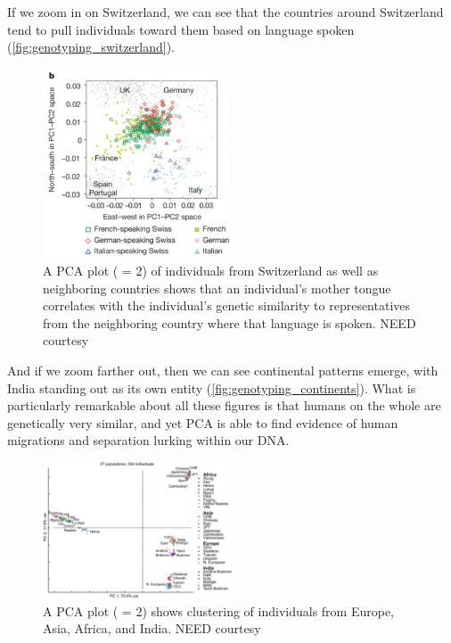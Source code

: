If we zoom in on Switzerland, we can see that the countries around Switzerland tend to pull individuals toward them based on language spoken (\autoref{fig:genotyping_switzerland}).

\begin{figure}[h]
\centering
\mySfFamily
\includegraphics[width = 0.5\textwidth]{../images/genotyping_switzerland.png}
\caption{A PCA plot ( = 2) of individuals from Switzerland as well as neighboring countries shows that an individual's mother tongue correlates with the individual's genetic similarity to representatives from the neighboring country where that language is spoken. NEED courtesy}
\label{fig:genotyping_switzerland}
\end{figure}

And if we zoom farther out, then we can see continental patterns emerge, with India standing out as its own entity (\autoref{fig:genotyping_continents}). What is particularly remarkable about all these figures is that humans on the whole are genetically very similar, and yet PCA is able to find evidence of human migrations and separation lurking within our DNA.

\begin{figure}[h]
\centering
\mySfFamily
\includegraphics[width = 0.5\textwidth]{../images/genotyping_continents.png}
\caption{A PCA plot ( = 2) shows clustering of individuals from Europe, Asia, Africa, and India. NEED courtesy}
\label{fig:genotyping_continents}
\end{figure}

